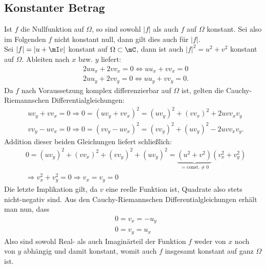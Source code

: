 	\subsection{Konstanter Betrag}
	Ist $f$ die Nullfunktion auf $\Omega$, so sind sowohl $|f|$ als auch $f$ auf $\Omega$ konstant. Sei also im Folgenden $f$ nicht konstant null, dann gilt dies auch für $|f|$.\\
	Sei $|f|=|u+\mI v|$ konstant auf $\Omega\subset\mC$, dann ist auch $|f|^{2}=u^{2}+v^{2}$ konstant auf $\Omega$. Ableiten nach $x$ bzw. $y$ liefert:
	\begin{align*}
		&2uu_{x}+2vv_{x}=0 \Leftrightarrow uu_{x}+vv_{x}=0\\
		&2uu_{y}+2vv_{y}=0 \Leftrightarrow uu_{y}+vv_{y}=0.
	\end{align*}
Da $f$ nach Voraussetzung komplex differenzierbar auf $\Omega$ ist, gelten die Cauchy-Riemannschen Differentialgleichungen:
	\begin{align*}
		&uv_{y}+vv_{x}=0 \Rightarrow 0=(uv_{y}+vv_{x})^{2}=(uv_{y})^{2}+(vv_{x})^{2}+2uvv_{x}v_{y}\\
		&vv_{y}-uv_{x}=0 \Rightarrow 0=(vv_{y}-uv_{x})^{2}=(vv_{y})^{2}+(uv_{y})^{2}-2uvv_{x}v_{y}.
	\end{align*}
Addition dieser beiden Gleichungen liefert schließlich:
	\begin{align*}
		&0=(uv_{y})^{2}+(vv_{x})^{2}+(vv_{y})^{2}+(uv_{y})^{2}=\underbrace{(u^{2}+v^{2})}_{=\text{const.}\neq0}			(v_{x}^{2}+v_{y}^{2})\\
		&\Rightarrow v_{x}^{2}+v_{y}^{2}=0 \Rightarrow v_{x}=v_{y}=0
	\end{align*}
Die letzte Implikation gilt, da $v$ eine reelle Funktion ist, Quadrate also stets nicht-negativ sind. Aus den Cauchy-Riemannschen Differentialgleichungen erhält man nun, dass
	\begin{align*}
		&0=v_{x}=-u_{y}\\
		&0=v_{y}=u_{x}
	\end{align*}
Also sind sowohl Real- als auch Imaginärteil der Funktion $f$ weder von $x$ noch von $y$ abhängig und damit konstant, womit auch $f$ insgesamt konstant auf ganz $\Omega$ ist.
